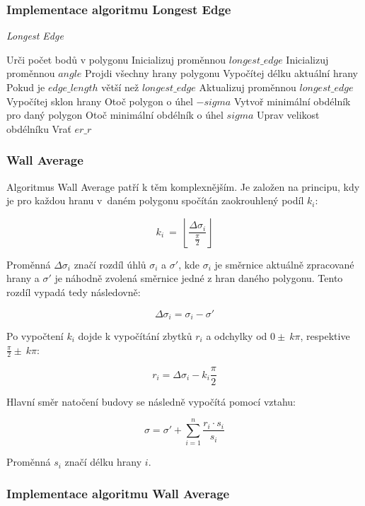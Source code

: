 \documentclass{article}
\begin{document}
\begin{spacing}{1.5}
\subsubsection*{Implementace algoritmu Longest Edge}
\begin{algorithm}[h]
    \caption {\textit{Longest Edge}}
    \begin{algorithmic}[1]
        \State Urči počet bodů v polygonu
        \State Inicializuj proměnnou $longest\_edge$
        \State Inicializuj proměnnou $angle$
        \State Projdi všechny hrany polygonu
        \State \indent Vypočítej délku aktuální hrany
        \State \indent Pokud je $edge\_length$ větší než $longest\_edge$
        \State \indent \indent Aktualizuj proměnnou $longest\_edge$
        \State \indent \indent Vypočítej sklon hrany
        \State Otoč polygon o úhel $-sigma$
        \State Vytvoř minimální obdélník pro daný polygon
        \State Otoč minimální obdélník o úhel $sigma$
        \State Uprav velikost obdélníku 
        \State Vrať $er\_r$
    \end{algorithmic}
\end{algorithm}

\newpage
\subsubsection{Wall Average}
Algoritmus Wall Average patří k těm komplexnějším. Je založen na principu, kdy je pro každou hranu v~daném polygonu spočítán zaokrouhlený podíl $k_i$: 

$$k_i\ =\ \left\lfloor\frac{\Delta\sigma_i}{\frac{\pi}{2}}\right\rfloor$$

Proměnná $\Delta\sigma_i$ značí rozdíl úhlů $\sigma_i$ a $\sigma'$, kde $\sigma_i$ je směrnice aktuálně zpracované hrany a $\sigma'$ je náhodně zvolená směrnice jedné z hran daného polygonu. Tento rozdíl vypadá tedy následovně:

$$\Delta\sigma_i = \sigma_i - \sigma'$$

Po vypočtení $k_i$ dojde k vypočítání zbytků $r_i$ a odchylky od $0\pm\ k\pi$, respektive $\frac{\pi}{2}\pm\ k\pi$:

$$r_i = \Delta\sigma_i - k_i\frac{\pi}{2}$$

Hlavní směr natočení budovy se následně vypočítá pomocí vztahu:

$$\sigma = \sigma' + \sum_{i = 1}^{n}\frac{r_i\cdot s_i}{s_i}$$

Proměnná $s_i$ značí délku hrany $i$.

\subsubsection*{Implementace algoritmu Wall Average}


\end{spacing}
\end{document}
